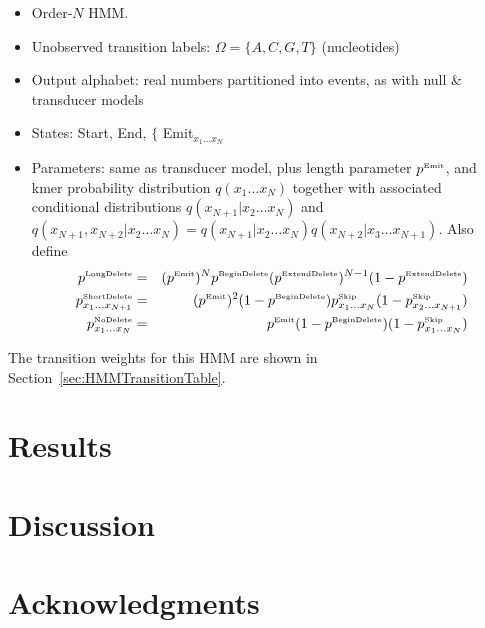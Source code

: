 \documentclass[10pt]{article}
\newcommand{\secref}[1]{Section~\ref{sec:#1}}
\begin{document}
\begin{itemize}
\item Order-$N$ HMM.
\item Unobserved transition labels: $\Omega = \{ A, C, G, T \}$ (nucleotides)
\item Output alphabet: real numbers partitioned into events, as with null \& transducer models
\item States: Start, End, $\{$ Emit${}_{x_1 \ldots x_N}$
\item Parameters: same as transducer model, plus length parameter $p^{\mbox{\tiny Emit}}$,
and kmer probability distribution
  $q(x_1\ldots x_N)$
together with associated conditional distributions
  $q(x_{N+1}|x_2\ldots x_N)$
and
  $q(x_{N+1},x_{N+2}|x_2\ldots x_N) = q(x_{N+1}|x_2\ldots x_N) q(x_{N+2}|x_3\ldots x_{N+1})$.
Also define
\begin{eqnarray*}
p^{\mbox{\tiny LongDelete}}
& = & (p^{\mbox{\tiny Emit}})^N p^{\mbox{\tiny BeginDelete}} (p^{\mbox{\tiny ExtendDelete}})^{N-1} (1 - p^{\mbox{\tiny ExtendDelete}})
\\
p^{\mbox{\tiny ShortDelete}}_{x_1\ldots x_{N+1}}
& = & (p^{\mbox{\tiny Emit}})^2 (1 - p^{\mbox{\tiny BeginDelete}}) p^{\mbox{\tiny Skip}}_{x_1\ldots x_N} (1 - p^{\mbox{\tiny Skip}}_{x_2\ldots x_{N+1}})
\\
p^{\mbox{\tiny NoDelete}}_{x_1\ldots x_N}
& = & p^{\mbox{\tiny Emit}} (1 - p^{\mbox{\tiny BeginDelete}}) (1 - p^{\mbox{\tiny Skip}}_{x_1\ldots x_N})
\end{eqnarray*}
\end{itemize}

The transition weights for this HMM are shown in \secref{HMMTransitionTable}.


\newpage
\section{Results}




\section{Discussion}


\newpage
\section{Acknowledgments}
\end{document}
